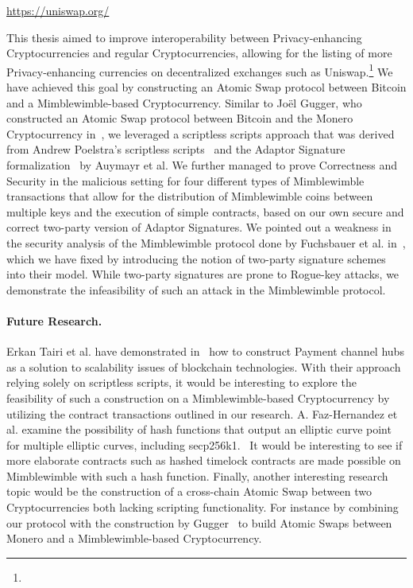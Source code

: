 \urldef{\urluniswp}\url{https://uniswap.org/}

This thesis aimed to improve interoperability between Privacy-enhancing Cryptocurrencies and regular Cryptocurrencies, allowing for the listing of more Privacy-enhancing currencies on decentralized exchanges such as Uniswap.\footnote{\urluniswp}
We have achieved this goal by constructing an Atomic Swap protocol between Bitcoin and a Mimblewimble-based Cryptocurrency.
Similar to Joël Gugger, who constructed an Atomic Swap protocol between Bitcoin and the Monero Cryptocurrency in~\cite{gugger2020bitcoin}, we leveraged a scriptless scripts approach that was derived from Andrew Poelstra's scriptless scripts~\cite{poelstra2017scriptless} and the Adaptor Signature formalization~\cite{aumayr2020bitcoinchannels} by Auymayr et al.
We further managed to prove Correctness and Security in the malicious setting for four different types of Mimblewimble transactions that allow for the distribution of Mimblewimble coins between multiple keys and the execution of simple contracts, based on our own secure and correct two-party version of Adaptor Signatures.
We pointed out a weakness in the security analysis of the Mimblewimble protocol done by Fuchsbauer et al. in~\cite{fuchsbauer2019aggregate}, which we have fixed by introducing the notion of two-party signature schemes into their model.
While two-party signatures are prone to Rogue-key attacks, we demonstrate the infeasibility of such an attack in the Mimblewimble protocol.

\paragraph{Future Research.} Erkan Tairi et al. have demonstrated in~\cite{tairi2019a2l} how to construct Payment channel hubs as a solution to scalability issues of blockchain technologies.
With their approach relying solely on scriptless scripts, it would be interesting to explore the feasibility of such a construction on a Mimblewimble-based Cryptocurrency by utilizing the contract transactions outlined in our research.
A. Faz-Hernandez et al. examine the possibility of hash functions that output an elliptic curve point for multiple elliptic curves, including secp256k1.~\cite{hernandez2020hashing} It would be interesting to see if more elaborate contracts such as hashed timelock contracts are made possible on Mimblewimble with such a hash function.
Finally, another interesting research topic would be the construction of a cross-chain Atomic Swap between two Cryptocurrencies both lacking scripting functionality.
For instance by combining our protocol with the construction by Gugger~\cite{gugger2020bitcoin} to build Atomic Swaps between Monero and a Mimblewimble-based Cryptocurrency.


